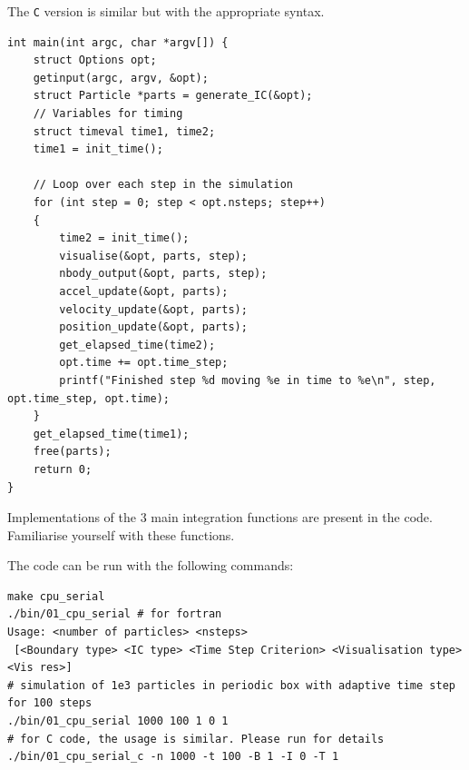 The \texttt{C} version is similar but with the appropriate syntax.
\begin{center}
\begin{minipage}{0.95\textwidth}
\begin{verbatim}
int main(int argc, char *argv[]) {
    struct Options opt;
    getinput(argc, argv, &opt);
    struct Particle *parts = generate_IC(&opt);
    // Variables for timing
    struct timeval time1, time2;
    time1 = init_time();
    
    // Loop over each step in the simulation
    for (int step = 0; step < opt.nsteps; step++) 
    {
        time2 = init_time();
        visualise(&opt, parts, step);
        nbody_output(&opt, parts, step);
        accel_update(&opt, parts);
        velocity_update(&opt, parts);
        position_update(&opt, parts);
        get_elapsed_time(time2);
        opt.time += opt.time_step;
        printf("Finished step %d moving %e in time to %e\n", step, opt.time_step, opt.time);
    }
    get_elapsed_time(time1);
    free(parts);
    return 0;
}
\end{verbatim}
\end{minipage}
\end{center}


Implementations of the 3 main integration functions are present in the code. Familiarise yourself with these functions. 

\par 
The code can be run with the following commands: 
\begin{center}
\begin{minipage}{0.95\textwidth}
\small
\begin{verbatim}
make cpu_serial
./bin/01_cpu_serial # for fortran 
Usage: <number of particles> <nsteps>
 [<Boundary type> <IC type> <Time Step Criterion> <Visualisation type> <Vis res>]
# simulation of 1e3 particles in periodic box with adaptive time step for 100 steps  
./bin/01_cpu_serial 1000 100 1 0 1
# for C code, the usage is similar. Please run for details 
./bin/01_cpu_serial_c -n 1000 -t 100 -B 1 -I 0 -T 1 
\end{verbatim}
\end{minipage}
\end{center}

